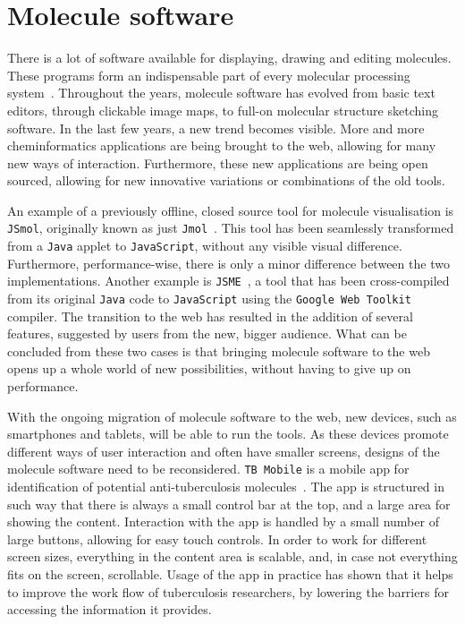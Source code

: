 \section{Molecule software}
There is a lot of software available for displaying, drawing and editing molecules. These programs form an indispensable part of every molecular processing system~\cite{ertl2010molecular}. Throughout the years, molecule software has evolved from basic text editors, through clickable image maps, to full-on molecular structure sketching software. In the last few years, a new trend becomes visible. More and more cheminformatics applications are being brought to the web, allowing for many new ways of interaction. Furthermore, these new applications are being open sourced, allowing for new innovative variations or combinations of the old tools.

An example of a previously offline, closed source tool for molecule visualisation is \verb|JSmol|, originally known as just \verb|Jmol|~\cite{hanson2013jsmol}. This tool has been seamlessly transformed from a \verb|Java| applet to \verb|JavaScript|, without any visible visual difference. Furthermore, performance-wise, there is only a minor difference between the two implementations. Another example is \verb|JSME|~\cite{bienfait2013jsme}, a tool that has been cross-compiled from its original \verb|Java| code to \verb|JavaScript| using the \verb|Google Web Toolkit| compiler. The transition to the web has resulted in the addition of several features, suggested by users from the new, bigger audience. What can be concluded from these two cases is that bringing molecule software to the web opens up a whole world of new possibilities, without having to give up on performance.

With the ongoing migration of molecule software to the web, new devices, such as smartphones and tablets, will be able to run the tools. As these devices promote different ways of user interaction and often have smaller screens, designs of the molecule software need to be reconsidered. \verb|TB Mobile| is a mobile app for identification of potential anti-tuberculosis molecules~\cite{ekins2013tb}. The app is structured in such way that there is always a small control bar at the top, and a large area for showing the content. Interaction with the app is handled by a small number of large buttons, allowing for easy touch controls. In order to work for different screen sizes, everything in the content area is scalable, and, in case not everything fits on the screen, scrollable. Usage of the app in practice has shown that it helps to improve the work flow of tuberculosis researchers, by lowering the barriers for accessing the information it provides.

